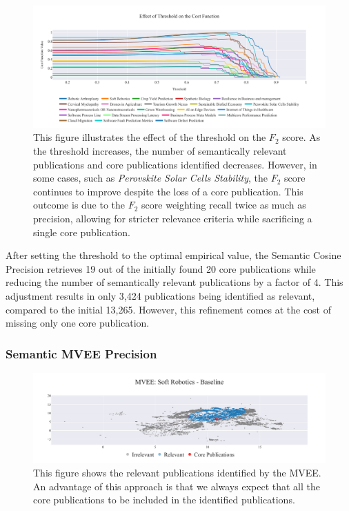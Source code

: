 \begin{figure}[!t]
	\hspace*{-.5cm}
	\includegraphics[scale=0.45]{pics/threshold-analysis.pdf}
	\caption[Semantic Cosine Threshold: Empirical Analysis]{This figure illustrates the effect of the threshold on the $F_2$ score. As the threshold increases, the number of semantically relevant publications and core publications identified decreases. However, in some cases, such as \textit{Perovskite Solar Cells Stability}, the $F_2$ score continues to improve despite the loss of a core publication. This outcome is due to the $F_2$ score weighting recall twice as much as precision, allowing for stricter relevance criteria while sacrificing a single core publication.}\label{fig:threshold-analysis}
\end{figure}

After setting the threshold to the optimal empirical value, the Semantic Cosine Precision retrieves 19 out of the initially found 20 core publications while reducing the number of semantically relevant publications by a factor of 4. This adjustment results in only 3,424 publications being identified as relevant, compared to the initial 13,265. However, this refinement comes at the cost of missing only one core publication.

\subsubsection{Semantic MVEE Precision}
\newcommand{\eumap}{\mathop{}\!\mathrm{E_{umap}}}
\newcommand{\eo}{\mathop{}\!\mathrm{E_{o}}}
\begin{figure}
	\hspace*{-1cm}	
	\includegraphics[scale=0.45]{pics/sr-mvee-baseline.pdf}
	\caption[Semantic MVEE: Soft Robotics]{This figure shows the relevant publications identified by the MVEE. An advantage of this approach is that we always expect that all the core publications to be included in the identified publications.}\label{fig:sr-mvee-baseline}
\end{figure}

